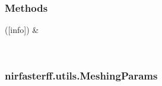 \documentclass[letterpaper,10pt,english]{sphinxmanual}
\begin{document}
\begin{fulllineitems}
\subsubsection*{Methods}


\begin{savenotes}\sphinxattablestart
\sphinxthistablewithglobalstyle
\sphinxthistablewithnovlinesstyle
\centering
\begin{tabulary}{\linewidth}[t]{}
\sphinxtoprule
\sphinxtableatstartofbodyhook
\sphinxAtStartPar
{\hyperref[\detokenize{_autosummary/nirfasterff.utils.ConvergenceInfo:nirfasterff.utils.ConvergenceInfo.__init__}]{}}({[}info{]})
&
\sphinxAtStartPar

\\
\sphinxbottomrule
\end{tabulary}
\sphinxtableafterendhook\par
\sphinxattableend\end{savenotes}

\end{fulllineitems}


\sphinxstepscope


\subsubsection{nirfasterff.utils.MeshingParams}
\label{\detokenize{_autosummary/nirfasterff.utils.MeshingParams:nirfasterff-utils-meshingparams}}\label{\detokenize{_autosummary/nirfasterff.utils.MeshingParams::doc}}
\end{document}
